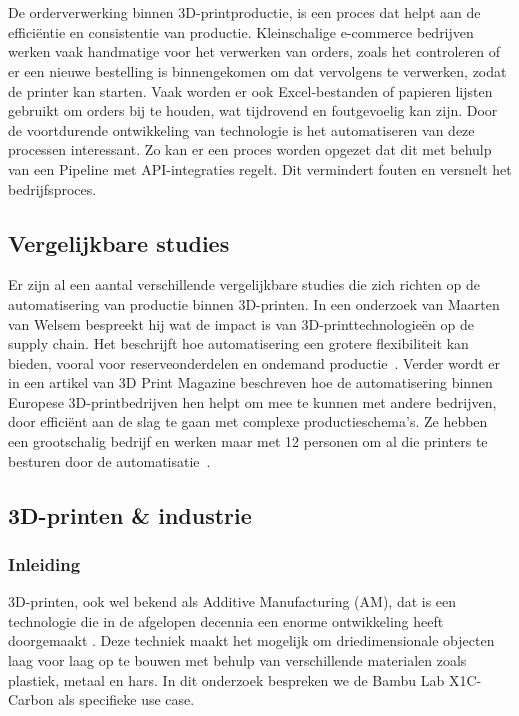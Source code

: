 \chapter{}%
\label{ch:stand-van-zaken}

De orderverwerking binnen 3D-printproductie, is een proces dat helpt aan de efficiëntie en consistentie van productie. Kleinschalige e-\-commerce bedrijven werken vaak handmatige voor het verwerken van orders, zoals het controleren of er een nieuwe bestelling is binnengekomen om dat vervolgens te verwerken, zodat de printer kan starten. Vaak worden er ook Excel-bestanden of papieren lijsten gebruikt om orders bij te houden, wat tijdrovend en foutgevoelig kan zijn. Door de voortdurende ontwikkeling van technologie is het automatiseren van deze processen interessant. Zo kan er een proces worden opgezet dat dit met behulp van een Pipeline met API-integraties regelt. Dit vermindert fouten en versnelt het bedrijfsproces. 

\section{Vergelijkbare studies}%
\label{sec:Vergelijkbare studie}

Er zijn al een aantal verschillende vergelijkbare studies die zich richten op de automatisering van productie binnen 3D-printen. In een onderzoek van Maarten van Welsem bespreekt hij wat de impact is van 3D-printtechnologieën op de supply chain. Het beschrijft hoe automatisering een grotere flexibiliteit kan bieden, vooral voor reserveonderdelen en ondemand productie~\autocite{emerce3DprintSupplyChain}. Verder wordt er in een artikel van 3D Print Magazine beschreven hoe de automatisering binnen Europese 3D-printbedrijven hen helpt om mee te kunnen met andere bedrijven, door efficiënt aan de slag te gaan met complexe productieschema's. Ze hebben een grootschalig bedrijf en werken maar met 12 personen om al die printers te besturen door de automatisatie~\autocite{3dprintmagAutomation}. 

\newpage

\section{3D-printen \& industrie}%
\label{sec:3D-printen & industrie}

\subsection{Inleiding}
3D-printen, ook wel bekend als Additive Manufacturing (AM), dat is een technologie die in de afgelopen decennia een enorme ontwikkeling heeft doorgemaakt \autocite{3dPrintingIndustry}. Deze techniek maakt het mogelijk om driedimensionale objecten laag voor laag op te bouwen met behulp van verschillende materialen zoals plastiek, metaal en hars. In dit onderzoek bespreken we de Bambu Lab X1C-Carbon als specifieke use case.


